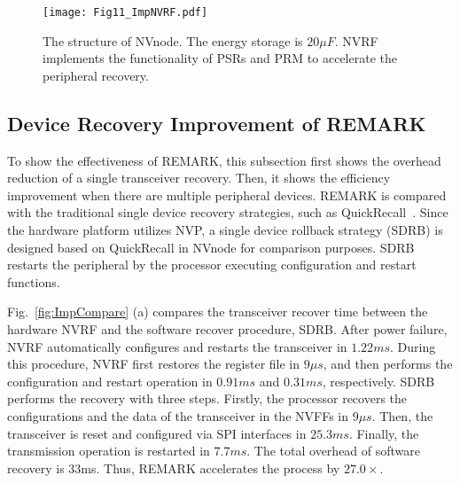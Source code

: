 \begin{figure}[htpb]
    \centering
    \texttt{[image: Fig11\_ImpNVRF.pdf]}
    \caption{The structure of NVnode. The energy storage is $20\mu F$. NVRF implements the functionality of PSRs and PRM to accelerate the peripheral recovery.}
    \label{fig:ImpNVRF}
\end{figure}



\subsection{Device Recovery Improvement of REMARK} \label{sec:implPeriRecover}
%
To show the effectiveness of REMARK, this subsection first shows the overhead reduction of a single transceiver recovery. 
Then, it shows the efficiency improvement when there are multiple peripheral devices. 
REMARK is compared with the traditional single device recovery strategies, such as QuickRecall~\cite{jayakumar2014quickrecall}. 
Since the hardware platform utilizes NVP, a single device rollback strategy (SDRB) is designed based on QuickRecall in NVnode for comparison purposes.
SDRB restarts the peripheral by the processor executing configuration and restart functions.

Fig.~\ref{fig:ImpCompare} (a) compares the transceiver recover time between the hardware NVRF and the software recover procedure, SDRB.
After power failure, NVRF automatically configures and restarts the transceiver in $1.22ms$.
During this procedure, NVRF first restores the register file in $9 \mu s$, and then performs the configuration and restart operation in $0.91ms$ and $0.31ms$, respectively. 
SDRB performs the recovery with three steps.
Firstly, the processor recovers the configurations and the data of the transceiver in the NVFFs in $9\mu s$.
Then, the transceiver is reset and configured via SPI interfaces in $25.3ms$.
Finally, the transmission operation is restarted in $7.7ms$.
The total overhead of software recovery is 33ms.
Thus, REMARK accelerates the process by $27.0\times$. 

